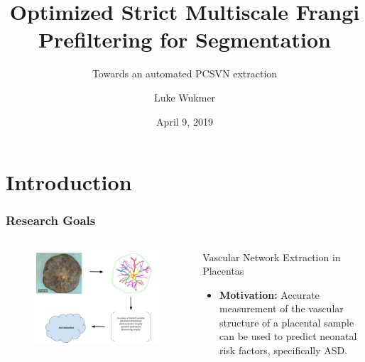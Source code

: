 \documentclass[9pt,notes]{beamer}
\title[Cake Defense]{Optimized Strict Multiscale Frangi Prefiltering for Segmentation}
\subtitle{Towards an automated PCSVN extraction}
\author[{Luke Wukmer}] %
{{Luke Wukmer}}%
\institute[CSULB] %
{
  Advisor: Dr. Jen-Mei Chang\\
  Department of Mathematics and Statistics\\
  California State University, Long Beach\\
  \texttt{lwukmer@gmail.com}
}
\date{April 9, 2019}
\begin{document}
\begin{frame} %
  \titlepage
\end{frame}

\section{Introduction}
\begin{frame} %
\AtEndNote{\par}
	\frametitle{Research Goals}
	\begin{columns}[c]
		\begin{column}{0.5\textwidth}
			\begin{figure}
			\includegraphics[width=\textwidth]{general_research_question.png}
			\end{figure}
		\end{column}
		\begin{column}{0.5\textwidth}
			\begin{block}{Vascular Network Extraction in Placentas}
				\begin{itemize}
					\item \textbf{Motivation:}
            Accurate measurement of the vascular structure of a placental sample
            can be used to predict neonatal risk factors, specifically ASD.

\end{itemize}
\end{block}
\end{column}
\end{columns}
\end{frame}
\end{document}
